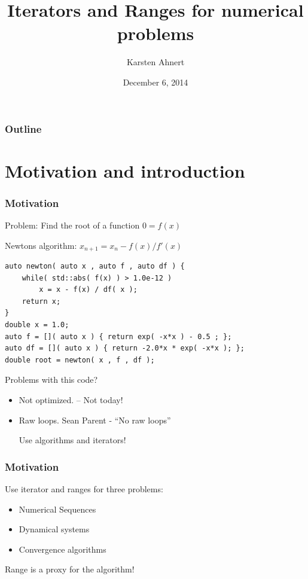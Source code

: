 \documentclass{beamer}
\title[Iteratorst]{Iterators and Ranges for numerical problems}
\author[Karsten Ahnert]{Karsten Ahnert}
\institute[Ambrosys]{Ambrosys GmbH, Potsdam}
\date{December 6, 2014}
\newcommand{\heading}[1]{\frametitle{#1}}
\begin{document}
\frame{
  \titlepage


}



\begin{frame}
  \heading{Outline}

  \tableofcontents
\end{frame}



\section{Motivation and introduction}




\begin{frame}[fragile]
\heading{Motivation}

Problem: Find the root of a function \hspace{2ex} $0=f(x)$

\vspace{0.5ex}
Newtons algorithm: \hspace{2ex} $x_{n+1} = x_n - f(x)/f'(x)$
\vspace{2ex}
  \begin{lstlisting}[basicstyle=\scriptsize\ttfamily]
auto newton( auto x , auto f , auto df ) {
    while( std::abs( f(x) ) > 1.0e-12 )
        x = x - f(x) / df( x );
    return x;
}
double x = 1.0;
auto f = []( auto x ) { return exp( -x*x ) - 0.5 ; };
auto df = []( auto x ) { return -2.0*x * exp( -x*x ); };
double root = newton( x , f , df );
  \end{lstlisting}
\vspace{2ex}
Problems with this code?

\pause
\begin{itemize}
 \item Not optimized. \pause -- Not today!
 \item Raw loops. Sean Parent - ``No raw loops''
 
 \vspace{0.5ex}
 Use algorithms and iterators!
\end{itemize}
 
\end{frame}



\begin{frame}[fragile]
 \heading{Motivation}
 
 Use iterator and ranges for three problems:
 
 \begin{itemize}
  \item Numerical Sequences
  \item Dynamical systems
  \item Convergence algorithms
 \end{itemize}
 
 \vspace{2ex}
 
 Range is a proxy for the algorithm!

\end{frame}
\end{document}
